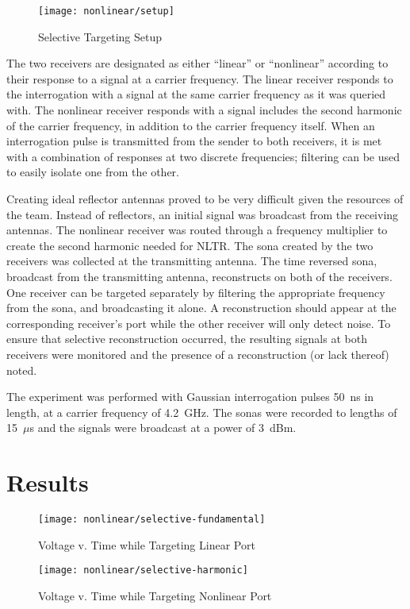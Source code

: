 \begin{figure}[t]
\centering
\texttt{[image: nonlinear/setup]}
    \caption[Selective Targeting Setup]{Selective Targeting Setup}
    \label{fig:selective-setup}
\end{figure}

The two receivers are designated as either ``linear'' or ``nonlinear'' according to their response to a signal at a carrier frequency. The linear receiver responds to the interrogation with a signal at the same carrier frequency as it was queried with. The nonlinear receiver responds with a signal includes the second harmonic of the carrier frequency, in addition to the carrier frequency itself. When an interrogation pulse is transmitted from the sender to both receivers, it is met with a combination of responses at two discrete frequencies; filtering can be used to easily isolate one from the other.

Creating ideal reflector antennas proved to be very difficult given the resources of the team.  Instead of reflectors, an initial signal was broadcast from the receiving antennas.  The nonlinear receiver was routed through a frequency multiplier to create the second harmonic needed for NLTR.  The sona created by the two receivers was collected at the transmitting antenna.  The time reversed sona, broadcast from the transmitting antenna, reconstructs on both of the receivers.  One receiver can be targeted separately by filtering the appropriate frequency from the sona, and broadcasting it alone. A reconstruction should appear at the corresponding receiver's port while the other receiver will only detect noise. To ensure that selective reconstruction occurred, the resulting signals at both receivers were monitored and the presence of a reconstruction (or lack thereof) noted. 

The experiment was performed with Gaussian interrogation pulses 50~ns in length, at a carrier frequency of 4.2~GHz. The sonas were recorded to lengths of 15~$\mu$s and the signals were broadcast at a power of 3~dBm.

\section{Results}
\label{sec:selective-results}

\begin{figure}[h]
\centering
\texttt{[image: nonlinear/selective-fundamental]}
    \caption[Selective Targeting Linear Port]{Voltage v. Time while Targeting Linear Port}
    \label{fig:selective-fundamental}
\end{figure}
\begin{figure}[h]
\centering
\texttt{[image: nonlinear/selective-harmonic]}
    \caption[Selective Targeting Nonlinear Port]{Voltage v. Time while Targeting Nonlinear Port}
    \label{fig:selective-harmonic}
\end{figure}


